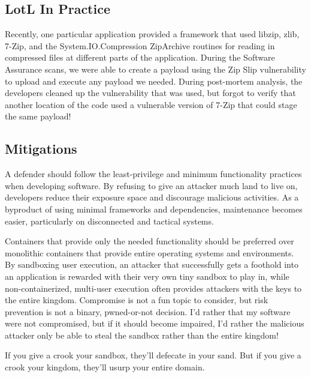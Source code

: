 \subsection{LotL In Practice}

Recently, one particular application provided a framework that used libzip, zlib, 7-Zip, and the System.IO.Compression ZipArchive routines for reading in compressed files at different parts of the application. During the Software Assurance scans, we were able to create a payload using the Zip Slip vulnerability to upload and execute any payload we needed. During post-mortem analysis, the developers cleaned up the vulnerability that was used, but forgot to verify that another location of the code used a vulnerable version of 7-Zip that could stage the same payload!

\subsection{Mitigations}

A defender should follow the least-privilege and minimum functionality practices when developing software. By refusing to give an attacker much land to live on, developers reduce their exposure space and discourage malicious activities. As a byproduct of using minimal frameworks and dependencies, maintenance becomes easier, particularly on disconnected and tactical systems.

Containers that provide only the needed functionality should be preferred over monolithic containers that provide entire operating systems and environments. By sandboxing user execution, an attacker that successfully gets a foothold into an application is rewarded with their very own tiny sandbox to play in, while non-containerized, multi-user execution often provides attackers with the keys to the entire kingdom. Compromise is not a fun topic to consider, but risk prevention is not a binary, pwned-or-not decision. I'd rather that my software were not compromised, but if it should become impaired, I'd rather the malicious attacker only be able to steal the sandbox rather than the entire kingdom!

If you give a crook your sandbox, they'll defecate in your sand. But if you give a crook your kingdom, they'll usurp your entire domain.
